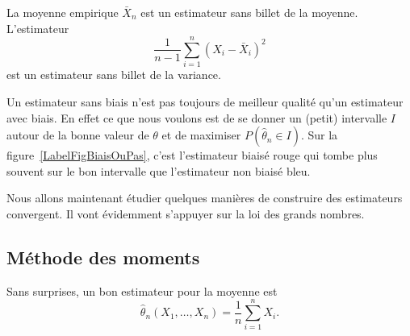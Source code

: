 \begin{example}
	La moyenne empirique \( \bar X_n\) est un estimateur sans billet de la moyenne. L'estimateur
	\begin{equation}
		\frac{1}{ n-1 }\sum_{i=1}^n(X_i-\bar X_i)^2
	\end{equation}
	est un estimateur sans billet de la variance.
\end{example}

Un estimateur sans biais n'est pas toujours de meilleur qualité qu'un estimateur avec biais. En effet ce que nous voulons est de se donner un (petit) intervalle  \( I\) autour de la bonne valeur de \( \theta\) et de maximiser \( P(\hat\theta_n\in I)\). Sur la figure~\ref{LabelFigBiaisOuPas}, c'est l'estimateur biaisé rouge qui tombe plus souvent sur le bon intervalle que l'estimateur non biaisé bleu.
\newcommand{\CaptionFigBiaisOuPas}{Un estimateur sans biais et un avec biais.}


Nous allons maintenant étudier quelques manières de construire des estimateurs convergent. Il vont évidemment s'appuyer sur la loi des grands nombres.

\subsection{Méthode des moments}

Sans surprises, un bon estimateur pour la moyenne est
\begin{equation}
	\hat\theta_n(X_1,\ldots,X_n)=\frac{1}{ n }\sum_{i=1}^nX_i.
\end{equation}

